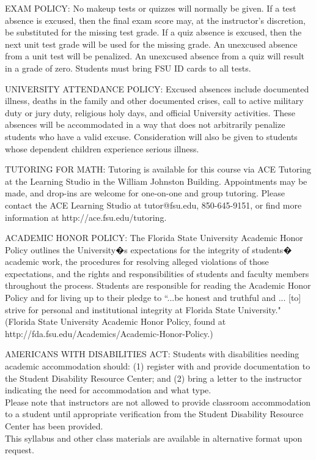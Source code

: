 \documentclass[12pt,oneside]{amsart}
\begin{document}
\noindent EXAM POLICY: No makeup tests or quizzes will normally be given. If a test absence is
excused, then the final exam score may,
at the instructor's discretion, be substituted for the missing test grade. If a
quiz absence is excused, then the next unit test grade will be used for
the missing grade. An unexcused absence from a unit test will be
penalized. An unexcused absence from a quiz will result in a grade of
zero. Students must bring FSU ID cards to all
tests.




\noindent UNIVERSITY ATTENDANCE POLICY:
Excused absences include documented illness, deaths in the family and other documented crises, call to active military duty or jury duty, religious holy days, and official University activities. These absences will be accommodated in a way that does not arbitrarily penalize students who have a valid excuse. Consideration will also be given to students whose dependent children experience serious illness.



\noindent TUTORING FOR MATH: Tutoring is available for this course via ACE Tutoring at the Learning Studio in the William Johnston Building.  Appointments may be made, and drop-ins are welcome for one-on-one and group tutoring.  Please contact the ACE Learning Studio at tutor@fsu.edu, 850-645-9151, or find more information at http://ace.fsu.edu/tutoring.


\noindent ACADEMIC HONOR POLICY:
The Florida State University Academic Honor Policy outlines the University�s expectations for the integrity of students� academic work, the procedures for resolving alleged violations of those expectations, and the rights and responsibilities of students and faculty members throughout the process. Students are responsible for reading the Academic Honor Policy and for living up to their pledge to ``...be honest and truthful and ... [to] strive for personal and institutional integrity at Florida State University." (Florida State University Academic Honor Policy, found at http://fda.fsu.edu/Academics/Academic-Honor-Policy.)

\noindent AMERICANS WITH DISABILITIES ACT:
Students with disabilities needing academic accommodation should:
(1) register with and provide documentation to the Student Disability Resource Center; and
(2) bring a letter to the instructor indicating the need for accommodation and what type.
\\
Please note that instructors are not allowed to provide classroom accommodation to a student until appropriate verification from the Student Disability Resource Center has been provided.
\\
This syllabus and other class materials are available in alternative format upon request.
\end{document}

